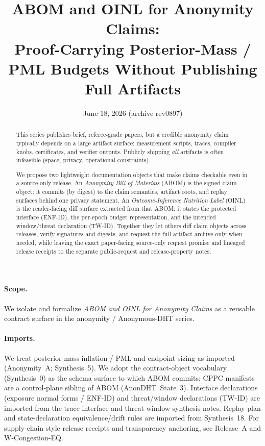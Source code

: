 \documentclass[11pt]{article}
\title{ABOM and OINL for Anonymity Claims:\\
Proof-Carrying Posterior-Mass / PML Budgets Without Publishing Full Artifacts}
\author{}
\date{June 18, 2026 (archive rev0897)}
\begin{document}
\maketitle

\begin{abstract}
This series publishes brief, referee-grade papers, but a credible anonymity claim typically depends on a large artifact surface: measurement scripts, traces, compiler knobs, certificates, and verifier outputs.
Publicly shipping \emph{all} artifacts is often infeasible (space, privacy, operational constraints).

We propose two lightweight documentation objects that make claims checkable even in a source-only release.
An \emph{Anonymity Bill of Materials} (ABOM) is the signed claim object: it commits (by digest) to the claim semantics, artifact roots, and replay surfaces behind one privacy statement.
An \emph{Outcome-Inference Nutrition Label} (OINL) is the reader-facing diff surface extracted from that ABOM: it states the protected interface (ENF-ID), the per-epoch budget representation, and the intended window/threat declaration (TW-ID).
Together they let others diff claim objects across releases, verify signatures and digests, and request the full artifact archive only when needed, while leaving the exact paper-facing source-only request promise and lineaged release receipts to the separate public-request and release-property notes.
\end{abstract}

\paragraph{Scope.}
We isolate and formalize \emph{ABOM and OINL for Anonymity Claims} as a reusable contract surface in the anonymity / Anonymous-DHT series.

\paragraph{Imports.}
We treat posterior-mass inflation / PML and endpoint sizing as imported (Anonymity~A; Synthesis~5).\cite{series:oddsinflation,series:endpointbridge}
We adopt the contract-object vocabulary (Synthesis~0) as the schema surface to which ABOM commits; CPPC manifests are a control-plane sibling of ABOM (AnonDHT~State~3).\cite{series:contractobjects,series:state3}
Interface declarations (exposure normal forms / ENF-ID) and threat/window declarations (TW-ID) are imported from the trace-interface and threat-window synthesis notes.\cite{series:traceifaces,series:threatwindows}
Replay-plan and state-declaration equivalence/drift rules are imported from Synthesis~18.\cite{series:planstateequiv}
For supply-chain style release receipts and transparency anchoring, see Release~A and W-Congestion-EQ.\cite{series:releaseproperty,series:wcongeq}
\end{document}
